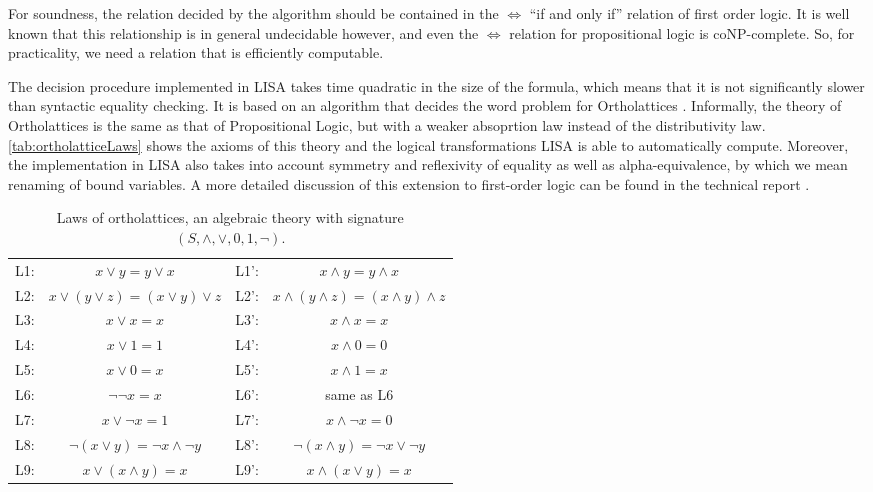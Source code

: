 For soundness, the relation decided by the algorithm should be contained in the $\Longleftrightarrow$ ``if and only if'' relation of first order logic. It is well known that this relationship is in general undecidable however, and even the $\Longleftrightarrow$ relation for propositional logic is coNP-complete. So, for practicality, we need a relation that is efficiently computable.

The decision procedure implemented in LISA takes time quadratic in the size of the formula, which means that it is not significantly slower than syntactic equality checking. 
It is based on an algorithm that decides the word problem for Ortholattices \cite{Guilloud:297701}. 
Informally, the theory of Ortholattices is the same as that of Propositional Logic, but with a weaker absoprtion law instead of the distributivity law. \autoref{tab:ortholatticeLaws} shows the axioms of this theory and the logical transformations LISA is able to automatically compute.
Moreover, the implementation in LISA also takes into account symmetry and reflexivity of equality as well as alpha-equivalence, by which we mean renaming of bound variables. A more detailed discussion of this extension to first-order logic can be found in the technical report \cite{Guilloud:300562}.

\begin{table}[bth]
  \centering
  \begin{tabular}{r c @{\hskip 2em} | @{\hskip 2em} r c}
       L1: & $x \lor y = y \lor x$  & L1': & $x \land y = y \land x$ \\
       L2: & $x \lor ( y \lor z) = (x \lor y) \lor z$  & L2': & $x \land ( y \land z) = (x \land y) \land z$ \\
       L3: & $x \lor x = x$  & L3': & $x \land x = x$ \\
       L4: & $x \lor 1 = 1$  & L4': & $x \land 0 = 0$ \\
       L5: & $x \lor 0 = x$  & L5': & $x \land 1 = x$ \\
       L6: & $\neg \neg x = x$  & L6': & same as L6  \\
       L7: & $x \lor \neg x = 1$  & L7': & $x \land \neg x = 0$ \\
       L8: & $\neg (x \lor y) = \neg x \land \neg y$  & L8': &  $\neg (x \land y) = \neg x \lor \neg y$ \\
       L9: & $x \lor (x \land y) = x$ & L9': & $x \land (x \lor y) = x$   \\
  \end{tabular}
  \caption{Laws of ortholattices, an algebraic theory with signature $(S, \land, \lor, 0, 1, \neg)$. \cite{Guilloud:297701}}
  \label{tab:ortholatticeLaws}
\end{table}


